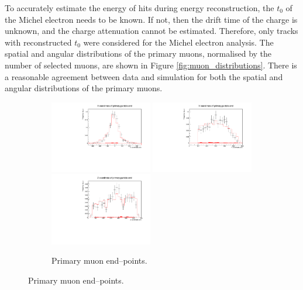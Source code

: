 To accurately estimate the energy of hits during energy reconstruction, the 
$t_0$ of the Michel electron needs to be known. If not, then the drift time of 
the charge is unknown, and the charge attenuation cannot be estimated. 
Therefore, only tracks with reconstructed $t_0$ were considered for the Michel 
electron analysis. The spatial and angular distributions of the primary muons, 
normalised by the number of selected muons, are shown in Figure 
\ref{fig:muon_distributions}. There is a reasonable agreement between data and 
simulation for both the spatial and angular distributions of the primary muons.
\begin{figure}

	\centering

	\begin{subfigure}[b]{\textwidth}
		\centering
		\includegraphics[width=0.49\textwidth]{figures/DataVMC_primary_EndX.pdf}
		\hfill
		\includegraphics[width=0.49\textwidth]{figures/DataVMC_primary_EndY.pdf}
		\includegraphics[width=0.49\textwidth]{figures/DataVMC_primary_EndZ.pdf}
		\caption {Primary muon end--points.}
		\label{fig:muon_endpoints}
	\end{subfigure}


\end{figure}
